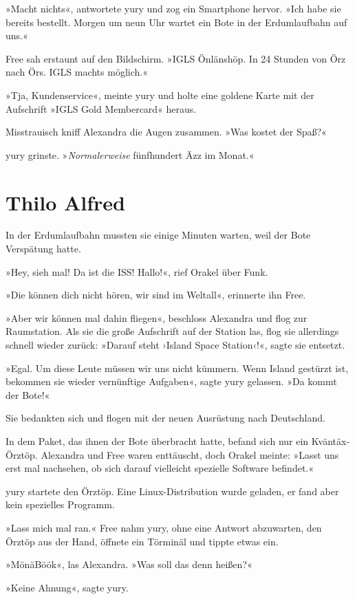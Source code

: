»Macht nichts«, antwortete yury und zog ein Smartphone hervor. »Ich habe sie bereits bestellt. Morgen um neun Uhr wartet ein Bote in der Erdumlaufbahn auf uns.«

Free sah erstaunt auf den Bildschirm. »IGLS Önlänshöp. In 24 Stunden von Örz nach Örs. IGLS machts möglich.«

»Tja, Kundenservice«, meinte yury und holte eine goldene Karte mit der Aufschrift »IGLS Gold Membercard« heraus.

Misstrauisch kniff Alexandra die Augen zusammen. »Was kostet der Spaß?«

yury grinste. »\textit{Normalerweise} fünfhundert Äzz im Monat.«


\chapter{Thilo Alfred}

In der Erdumlaufbahn mussten sie einige Minuten warten, weil der Bote Verspätung hatte.

»Hey, sieh mal! Da ist die ISS! Hallo!«, rief Orakel über Funk.

»Die können dich nicht hören, wir sind im Weltall«, erinnerte ihn Free.

»Aber wir können mal dahin fliegen«, beschloss Alexandra und flog zur Raumstation. Als sie die große Aufschrift auf der Station las, flog sie allerdings schnell wieder zurück: »Darauf steht ›Island Space Station‹!«, sagte sie entsetzt.

»Egal. Um diese Leute müssen wir uns nicht kümmern. Wenn Island gestürzt ist, bekommen sie wieder vernünftige Aufgaben«, sagte yury gelassen. »Da kommt der Bote!«

Sie bedankten sich und flogen mit der neuen Ausrüstung nach Deutschland.

In dem Paket, das ihnen der Bote überbracht hatte, befand sich nur ein Kväntäx-Örztöp. Alexandra und Free waren enttäuscht, doch Orakel meinte: »Lasst uns erst mal nachsehen, ob sich darauf vielleicht spezielle Software befindet.«

yury startete den Örztöp. Eine Linux-Distribution wurde geladen, er fand aber kein spezielles Programm.

»Lass mich mal ran.« Free nahm yury, ohne eine Antwort abzuwarten, den Örztöp aus der Hand, öffnete ein Törminäl und tippte etwas ein.

»MönäBöök«, las Alexandra. »Was soll das denn heißen?«

»Keine Ahnung«, sagte yury.

